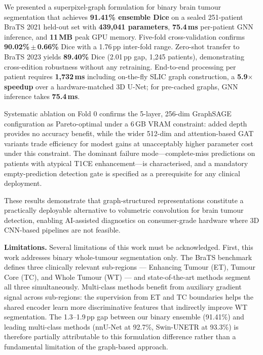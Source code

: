 \documentclass{article}
\begin{document}
We presented a superpixel-graph formulation for binary brain tumour segmentation
that achieves \textbf{91.41\% ensemble Dice} on a sealed 251-patient BraTS 2021
held-out set with \textbf{439,041 parameters}, \textbf{75.4\,ms} per-patient GNN
inference, and \textbf{11\,MB} peak GPU memory. Five-fold cross-validation confirms
\textbf{90.02\%\,$\pm$\,0.66\%} Dice with a 1.76\,pp inter-fold range. Zero-shot
transfer to BraTS 2023 yields \textbf{89.40\%} Dice (2.01\,pp gap, 1,245 patients),
demonstrating cross-edition robustness without any retraining. End-to-end processing
per patient requires \textbf{1,732\,ms} including on-the-fly SLIC graph construction,
a \textbf{5.9$\times$ speedup} over a hardware-matched 3D U-Net; for pre-cached
graphs, GNN inference takes \textbf{75.4\,ms}.

Systematic ablation on Fold 0 confirms the 5-layer, 256-dim GraphSAGE configuration
as Pareto-optimal under a 6\,GB VRAM constraint: added depth provides no accuracy
benefit, while the wider 512-dim and attention-based GAT variants trade efficiency
for modest gains at unacceptably higher parameter cost under this constraint. The
dominant failure mode---complete-miss predictions on patients with atypical T1CE
enhancement---is characterised, and a mandatory empty-prediction detection gate is
specified as a prerequisite for any clinical deployment.

These results demonstrate that graph-structured representations constitute a
practically deployable alternative to volumetric convolution for brain tumour
detection, enabling AI-assisted diagnostics on consumer-grade hardware where
3D CNN-based pipelines are not feasible.

\textbf{Limitations.}
Several limitations of this work must be acknowledged. First, this work addresses
binary whole-tumour segmentation only. The BraTS benchmark defines three clinically
relevant sub-regions --- Enhancing Tumour (ET), Tumour Core (TC), and Whole Tumour
(WT) --- and state-of-the-art methods segment all three simultaneously. Multi-class
methods benefit from auxiliary gradient signal across sub-regions: the supervision
from ET and TC boundaries helps the shared encoder learn more discriminative
features that indirectly improve WT segmentation. The 1.3--1.9\,pp gap between our
binary ensemble (91.41\%) and leading multi-class methods (nnU-Net at 92.7\%,
Swin-UNETR at 93.3\%) is therefore partially attributable to this formulation
difference rather than a fundamental limitation of the graph-based approach.
\end{document}
